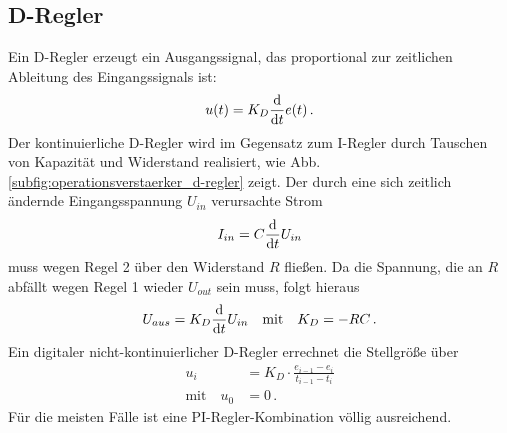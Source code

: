 \subsection{D-Regler}\label{d-regler}
Ein D-Regler erzeugt ein Ausgangssignal, das proportional zur zeitlichen
Ableitung des Eingangssignals ist:
\begin{equation}\label{eq:d-regler_01}
	u(t)=K_D\frac{\mathrm{d} }{\mathrm{d} t}e(t)\,.
\end{equation}
Der kontinuierliche D-Regler wird im Gegensatz zum I-Regler durch Tauschen von
Kapazität und Widerstand realisiert, wie Abb.
\ref{subfig:operationsverstaerker_d-regler} zeigt. Der durch eine sich zeitlich
ändernde Eingangsspannung $U_{in}$ verursachte Strom
\begin{equation}\label{eq:d-regler_02}
	I_{in}=C\frac{\mathrm{d} }{\mathrm{d} t}U_{in}
\end{equation}
muss wegen Regel 2 über den Widerstand $R$ fließen. Da die Spannung, die an $R$
abfällt wegen Regel 1 wieder $U_{out}$ sein muss, folgt hieraus
\begin{equation}\label{eq:d-regler_03}
	\begin{split}
		U_{aus}=K_D\frac{\mathrm{d} }{\mathrm{d} t}U_{in}
		\quad\text{mit}\quad
		K_D=-RC\,.
	\end{split}
\end{equation}
Ein digitaler nicht-kontinuierlicher D-Regler errechnet die Stellgröße über
\begin{equation}\label{eq:i-regler_03}
	\begin{split}
		u_i&=K_D\cdot\frac{e_{i-1}-e_i}{t_{i-1}-t_i}\\
		\text{mit}\quad
		u_{0}&=0\,.
	\end{split}
\end{equation}
Für die meisten Fälle ist eine PI-Regler-Kombination völlig ausreichend.

